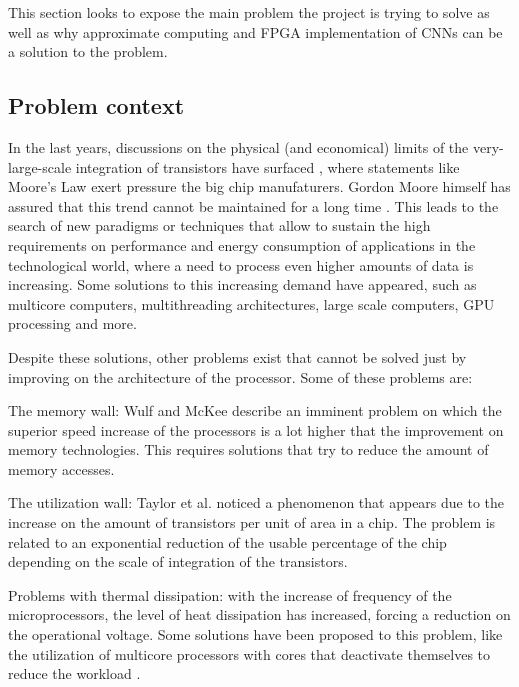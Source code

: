 This section looks to expose the main problem the project is trying to solve as well
as why approximate computing and FPGA implementation of CNNs can be a solution
to the problem.

\subsection{Problem context}

In the last years, discussions on the physical (and economical) limits of the very-large-scale integration 
of transistors have surfaced \cite{aftermoore}\cite{moorelawlimit}, where statements like Moore's Law exert pressure the big chip manufaturers.
Gordon Moore himself has assured that this trend cannot be maintained for a long time \cite{mooredead}. This leads to the
search of new paradigms or techniques that allow to sustain the high requirements on performance and 
energy consumption of applications in the technological world, where a need to process even higher amounts
of data is increasing. Some solutions to this increasing demand have appeared, such as multicore computers,
multithreading architectures, large scale computers, GPU processing and more.

Despite these solutions, other problems exist that cannot be solved just by improving on the architecture
of the processor. Some of these problems are:

\begin{compactitem}
    \item The memory wall: Wulf and McKee \cite{memorywall} describe an imminent problem on which the superior speed increase
    of the processors is a lot higher that the improvement on memory technologies. This requires solutions that
    try to reduce the amount of memory accesses.
    \item The utilization wall: Taylor et al. \cite{utilizationwall} noticed a phenomenon that appears due to the increase on the amount
    of transistors per unit of area in a chip. The problem is related to an exponential reduction of the usable
    percentage of the chip depending on the scale of integration of the transistors.
    \item Problems with thermal dissipation: with the increase of frequency of the microprocessors, the level of 
    heat dissipation has increased, forcing a reduction on the operational voltage. Some solutions have been proposed
    to this problem, like the utilization of multicore processors with cores that deactivate themselves to reduce
    the workload \cite{whitepaper}.
\end{compactitem}

